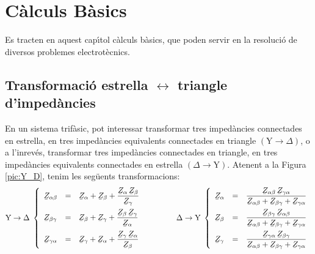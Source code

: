 \chapter{C\`{a}lculs B\`{a}sics}\label{sec:calc_bas}

Es tracten en aquest cap\'{\i}tol c\`{a}lculs b\`{a}sics, que poden servir en la
resoluci\'{o} de diversos problemes electrot\`{e}cnics.

\section{\texorpdfstring{Transformaci\'{o} estrella $\boldsymbol{\leftrightarrow}$ triangle d'imped\`{a}ncies}
    {Transformaci\'{o} estrella-triangle d'imped\`{a}ncies}}\label{secc:d_y} 

En un sistema trif\`{a}sic, pot interessar transformar tres imped\`{a}ncies connectades en
estrella, en tres imped\`{a}ncies equivalents connectades en triangle
$(\text{Y}\rightarrow\Delta)$, o a l'inrev\'{e}s, transformar tres imped\`{a}ncies connectades en
triangle, en tres imped\`{a}ncies equivalents connectades en estrella
$(\Delta\rightarrow\text{Y})$. Atenent a la Figura \vref{pic:Y_D}, tenim les seg\"{u}ents
transformacions:
\begin{equation}\label{eq:Y_D}
   \text{Y}\rightarrow\Delta\;\left\{
   \begin{array}{lll}
      \cmplx{Z}_{\alpha\beta} &= &\displaystyle \cmplx{Z}_{\alpha} + \cmplx{Z}_{\beta} + \frac{\cmplx{Z}_{\alpha}\,\cmplx{Z}_{\beta}}{\cmplx{Z}_{\gamma}}  \\[2.5ex]
      \cmplx{Z}_{\beta\gamma} &= &\displaystyle \cmplx{Z}_{\beta} + \cmplx{Z}_{\gamma} + \frac{\cmplx{Z}_{\beta}\,\cmplx{Z}_{\gamma}}{\cmplx{Z}_{\alpha}}  \\[2.5ex]
      \cmplx{Z}_{\gamma\alpha} &= &\displaystyle \cmplx{Z}_{\gamma} + \cmplx{Z}_{\alpha} + \frac{\cmplx{Z}_{\gamma}\, \cmplx{Z}_{\alpha}}{\cmplx{Z}_{\beta}}
   \end{array}
   \right.
   \qquad\qquad
   \Delta\rightarrow\text{Y}\;\left\{
   \begin{array}{lll}
      \cmplx{Z}_{\alpha} &= &\dfrac{\cmplx{Z}_{\alpha\beta}\, \cmplx{Z}_{\gamma\alpha}}{  \cmplx{Z}_{\alpha\beta} + \cmplx{Z}_{\beta\gamma}+ \cmplx{Z}_{\gamma\alpha}}  \\[2.5ex]
      \cmplx{Z}_{\beta} &= &\dfrac{\cmplx{Z}_{\beta\gamma}\, \cmplx{Z}_{\alpha\beta}}{  \cmplx{Z}_{\alpha\beta} + \cmplx{Z}_{\beta\gamma}+ \cmplx{Z}_{\gamma\alpha}}  \\[2.5ex]
      \cmplx{Z}_{\gamma} &= &\dfrac{\cmplx{Z}_{\gamma\alpha}\, \cmplx{Z}_{\beta\gamma}}{  \cmplx{Z}_{\alpha\beta} + \cmplx{Z}_{\beta\gamma}+ \cmplx{Z}_{\gamma\alpha}}
   \end{array}
   \right.
\end{equation}

